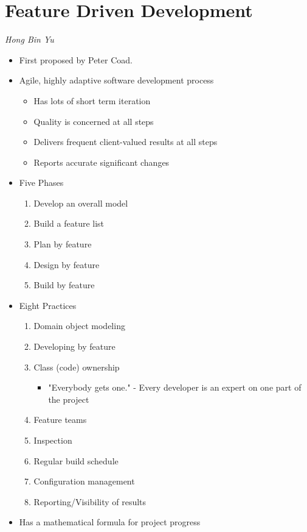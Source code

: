 \documentclass{report}
\begin{document}
		\section{Feature Driven Development}
			\textit{Hong Bin Yu}
			\begin{itemize}
				\item First proposed by Peter Coad.
				\item Agile, highly adaptive software development process
					\begin{itemize}
						\item Has lots of short term iteration
						\item Quality is concerned at all steps
						\item Delivers frequent client-valued results at all steps
						\item Reports accurate significant changes
					\end{itemize}
				\item Five Phases
					\begin{enumerate}
						\item Develop an overall model
						\item Build a feature list
						\item Plan by feature
						\item Design by feature
						\item Build by feature
					\end{enumerate}
				\item Eight Practices
					\begin{enumerate}
						\item Domain object modeling
						\item Developing by feature
						\item Class (code) ownership
							\begin{itemize}
								\item "Everybody gets one." - Every developer is an expert on one part of the project
							\end{itemize}
						\item Feature teams
						\item Inspection
						\item Regular build schedule
						\item Configuration management
						\item Reporting/Visibility of results
					\end{enumerate}
				\item Has a mathematical formula for project progress
			\end{itemize}
\end{document}
